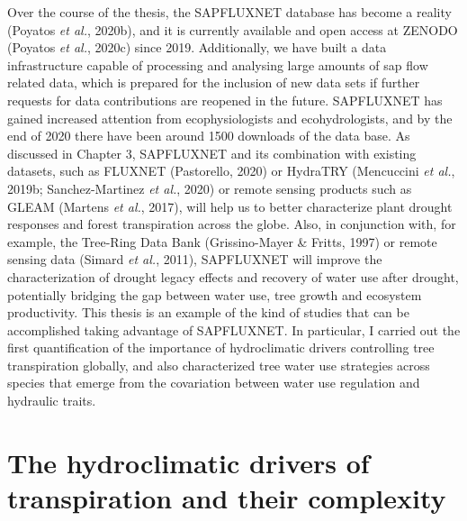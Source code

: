 \documentclass[11pt,twoside]{reedthesis}
\begin{document}
Over the course of the thesis, the SAPFLUXNET database has become a
reality (Poyatos \emph{et al.}, 2020b), and it is currently available
and open access at ZENODO (Poyatos \emph{et al.}, 2020c) since 2019.
Additionally, we have built a data infrastructure capable of processing
and analysing large amounts of sap flow related data, which is prepared
for the inclusion of new data sets if further requests for data
contributions are reopened in the future. SAPFLUXNET has gained
increased attention from ecophysiologists and ecohydrologists, and by
the end of 2020 there have been around 1500 downloads of the data base.
As discussed in Chapter 3, SAPFLUXNET and its combination with existing
datasets, such as FLUXNET (Pastorello, 2020) or HydraTRY (Mencuccini
\emph{et al.}, 2019b; Sanchez-Martinez \emph{et al.}, 2020) or remote
sensing products such as GLEAM (Martens \emph{et al.}, 2017), will help
us to better characterize plant drought responses and forest
transpiration across the globe. Also, in conjunction with, for example,
the Tree-Ring Data Bank (Grissino-Mayer \& Fritts, 1997) or remote
sensing data (Simard \emph{et al.}, 2011), SAPFLUXNET will improve the
characterization of drought legacy effects and recovery of water use
after drought, potentially bridging the gap between water use, tree
growth and ecosystem productivity. This thesis is an example of the kind
of studies that can be accomplished taking advantage of SAPFLUXNET. In
particular, I carried out the first quantification of the importance of
hydroclimatic drivers controlling tree transpiration globally, and also
characterized tree water use strategies across species that emerge from
the covariation between water use regulation and hydraulic traits.\par

\section{The hydroclimatic drivers of transpiration and their
complexity}\label{the-hydroclimatic-drivers-of-transpiration-and-their-complexity}
\end{document}
